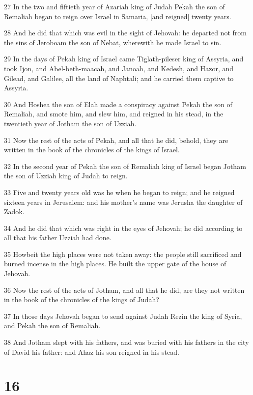 \par 27 In the two and fiftieth year of Azariah king of Judah Pekah the son of Remaliah began to reign over Israel in Samaria, [and reigned] twenty years.
\par 28 And he did that which was evil in the sight of Jehovah: he departed not from the sins of Jeroboam the son of Nebat, wherewith he made Israel to sin.
\par 29 In the days of Pekah king of Israel came Tiglath-pileser king of Assyria, and took Ijon, and Abel-beth-maacah, and Janoah, and Kedesh, and Hazor, and Gilead, and Galilee, all the land of Naphtali; and he carried them captive to Assyria.
\par 30 And Hoshea the son of Elah made a conspiracy against Pekah the son of Remaliah, and smote him, and slew him, and reigned in his stead, in the twentieth year of Jotham the son of Uzziah.
\par 31 Now the rest of the acts of Pekah, and all that he did, behold, they are written in the book of the chronicles of the kings of Israel.
\par 32 In the second year of Pekah the son of Remaliah king of Israel began Jotham the son of Uzziah king of Judah to reign.
\par 33 Five and twenty years old was he when he began to reign; and he reigned sixteen years in Jerusalem: and his mother's name was Jerusha the daughter of Zadok.
\par 34 And he did that which was right in the eyes of Jehovah; he did according to all that his father Uzziah had done.
\par 35 Howbeit the high places were not taken away: the people still sacrificed and burned incense in the high places. He built the upper gate of the house of Jehovah.
\par 36 Now the rest of the acts of Jotham, and all that he did, are they not written in the book of the chronicles of the kings of Judah?
\par 37 In those days Jehovah began to send against Judah Rezin the king of Syria, and Pekah the son of Remaliah.
\par 38 And Jotham slept with his fathers, and was buried with his fathers in the city of David his father: and Ahaz his son reigned in his stead.

\chapter{16}

